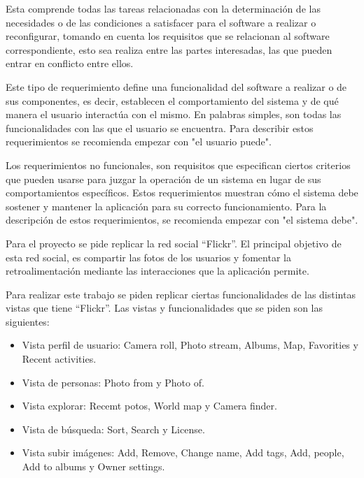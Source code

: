 \documentclass{memoria}
\begin{document}

Esta comprende todas las tareas relacionadas con la determinación de las necesidades o de las condiciones a satisfacer para el software a realizar o reconfigurar, tomando en cuenta los requisitos que se relacionan al software correspondiente, esto sea realiza entre las partes interesadas, las que pueden entrar en conflicto entre ellos.\\


Este tipo de requerimiento define una funcionalidad del software a realizar o de sus componentes, es decir, establecen el comportamiento del sistema y de qué manera el usuario interactúa con el mismo. En palabras simples, son todas las funcionalidades con las que el usuario se encuentra. Para describir estos requerimientos se recomienda empezar con "el usuario puede".\\


Los requerimientos no funcionales, son requisitos que especifican ciertos criterios que pueden usarse para juzgar la operación de un sistema en lugar de sus comportamientos específicos. Estos requerimientos muestran cómo el sistema debe sostener y mantener la aplicación para su correcto funcionamiento. Para la descripción de estos requerimientos, se recomienda empezar con "el sistema debe".


Para el proyecto se pide replicar la red social “Flickr”. El principal objetivo de esta red social, es compartir las fotos de los usuarios y fomentar la retroalimentación mediante las interacciones que la aplicación permite.

Para realizar este trabajo se piden replicar ciertas funcionalidades de las distintas vistas que tiene “Flickr”. Las vistas y funcionalidades que se piden son las siguientes:

\begin{itemize}
    \item Vista perfil de usuario: Camera roll, Photo stream, Albums, Map, Favorities y Recent activities.
    \item Vista de personas: Photo from y Photo of.
    \item Vista explorar: Recemt potos, World map y Camera finder.
    \item Vista de búsqueda: Sort, Search y License.
    \item Vista subir imágenes: Add, Remove, Change name, Add tags, Add, people, Add to albums y Owner settings.
\end{itemize}
\end{document}
